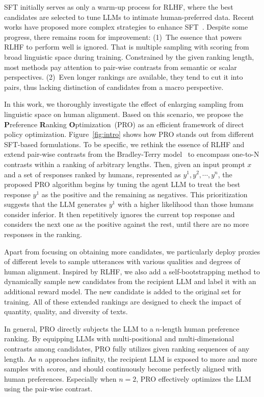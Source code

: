 SFT initially serves as only a warm-up process for RLHF, where the best candidates are selected to tune LLMs to intimate human-preferred data. Recent works have proposed more complex strategies to enhance SFT~\cite{rafailov2023direct, Wu2023fine,yuan2023rrhf,dong2023raft}. Despite some progress, there remains room for improvement: (1)~The essence that powers RLHF to perform well is ignored. That is multiple sampling with scoring from broad linguistic space during training. Constrained by the given ranking length, most methods pay attention to pair-wise contrasts from semantic or scalar perspectives. (2)~Even longer rankings are available, they tend to cut it into pairs, thus lacking distinction of candidates from a macro perspective. 

In this work, we thoroughly investigate the effect of enlarging sampling from linguistic space on human alignment. Based on this scenario, we propose the \textbf{P}reference \textbf{R}anking \textbf{O}ptimization~(PRO) as an efficient framework of direct policy optimization. Figure~\ref{fig:intro} shows how PRO stands out from different SFT-based formulations. To be specific, we rethink the essence of RLHF and extend pair-wise contrasts from the Bradley-Terry model~\cite{bradley1952rank} to encompass one-to-N contrasts within a ranking of arbitrary lengths. Then, given an input prompt $x$ and a set of responses ranked by humans, represented as $y^1, y^2, \cdots, y^n$, the proposed PRO algorithm begins by tuning the agent LLM to treat the best response $y^1$ as the positive and the remaining as negatives. This prioritization suggests that the LLM generates $y^1$ with a higher likelihood than those humans consider inferior. It then repetitively ignores the current top response and considers the next one as the positive against the rest, until there are no more responses in the ranking. 

Apart from focusing on obtaining more candidates, we particularly deploy proxies of different levels to sample utterances with various qualities and degrees of human alignment. Inspired by RLHF, we also add a self-bootstrapping method to dynamically sample new candidates from the recipient LLM and label it with an additional reward model. The new candidate is added to the original set for training. All of these extended rankings are designed to check the impact of quantity, quality, and diversity of texts.

In general, PRO directly subjects the LLM to a $n$-length human preference ranking. By equipping LLMs with multi-positional and multi-dimensional contrasts among candidates, PRO fully utilizes given ranking sequences of any length. As $n$ approaches infinity, the recipient LLM is exposed to more and more samples with scores, and should continuously become perfectly aligned with human preferences. Especially when $n=2$, PRO effectively optimizes the LLM using the pair-wise contrast.

